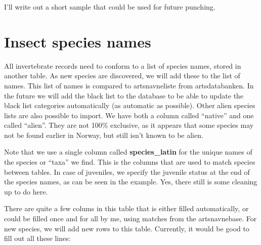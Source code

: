 \documentclass[]{article}
\newenvironment{Shaded}{\begin{snugshade}}{\end{snugshade}}
\newcommand{\DataTypeTok}[1]{\textcolor[rgb]{0.13,0.29,0.53}{#1}}
\newcommand{\DecValTok}[1]{\textcolor[rgb]{0.00,0.00,0.81}{#1}}
\newcommand{\KeywordTok}[1]{\textcolor[rgb]{0.13,0.29,0.53}{\textbf{#1}}}
\newcommand{\NormalTok}[1]{#1}
\newcommand{\OperatorTok}[1]{\textcolor[rgb]{0.81,0.36,0.00}{\textbf{#1}}}
\newcommand{\StringTok}[1]{\textcolor[rgb]{0.31,0.60,0.02}{#1}}
\begin{document}
I'll write out a short sample that could be used for future punching.

\begin{Shaded}
\end{Shaded}

\hypertarget{insect-species-names}{%
\section{Insect species names}\label{insect-species-names}}

All invertebrate records need to conform to a list of species names,
stored in another table. As new species are discovered, we will add
these to the list of names. This list of names is compared to
artsnavneliste from artsdatabanken. In the future we will add the black
list to the database to be able to update the black list categories
automatically (as automatic as possible). Other alien species lists are
also possible to import. We have both a column called ``native'' and one
called ``alien''. They are not 100\% exclusive, as it appears that some
species may not be found earlier in Norway, but still isn't known to be
alien.

Note that we use a single column called \textbf{species\_latin} for the
unique names of the species or ``taxa'' we find. This is the columns
that are used to match species between tables. In case of juveniles, we
specify the juvenile status at the end of the species names, as can be
seen in the example. Yes, there still is some cleaning up to do here.

There are quite a few colums in this table that is either filled
automatically, or could be filled once and for all by me, using matches
from the artsnavnebase. For new species, we will add new rows to this
table. Currently, it would be good to fill out all these lines:
\end{document}
